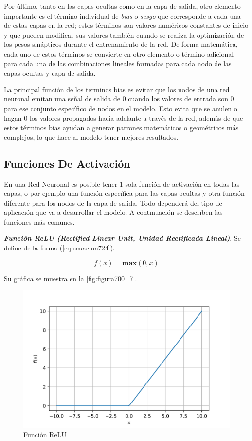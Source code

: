 {Por último, tanto en las capas ocultas como en la capa de salida, otro elemento importante es el término individual de \textit{bias} o \textit{sesgo} que corresponde a cada una de estas capas en la red; estos términos son 
valores numéricos constantes de inicio y que pueden modificar sus valores también cuando se realiza la optimización de los pesos sinápticos durante el entrenamiento de la red. De forma matemática, cada uno de estos términos 
se convierte en otro elemento o término adicional para cada una de las combinaciones lineales formadas para cada nodo de las capas ocultas y capa de salida.

La principal función de los terminos bias es evitar que los nodos de una red neuronal emitan una señal de salida de 0 cuando los valores de entrada son 0 para ese conjunto específico de nodos en el modelo. Esto evita que 
se anulen o hagan 0 los valores propagados hacia adelante a través de la red, además de que estos términos bias ayudan a generar patrones matemáticos o geométricos más complejos, lo que hace al modelo tener mejores resultados.

\subsection{Funciones De Activación}

En una Red Neuronal es posible tener 1 sola función de activación en todas las capas, o por ejemplo una función específica para las capas ocultas y otra función diferente para los nodos de la capa de salida. Todo dependerá 
del tipo de aplicación que va a desarrollar el modelo. A continuación se describen las funciones más comunes.

\textbf{\textit{Función ReLU (Rectified Linear Unit, Unidad Rectificada Lineal)}}. Se define de la forma (\ref{eq:ecuacion724}).

\begin{equation}
	f(x)=\textbf{max} (0,x)
	\label{eq:ecuacion724}
\end{equation}

Su gráfica se muestra en la \autoref{fig:figura700_7}.

\begin{figure}[h]
	\centering
	\includegraphics[scale=0.8]{imgss149.png}
	\caption{Función ReLU}
	\label{fig:figura700_7}
\end{figure}

}

